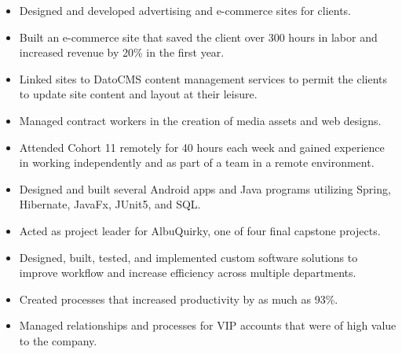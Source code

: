 \documentclass[12pt]{altacv}
\begin{document}

\begin{fullwidth}
\makecvheader
\end{fullwidth}


  \begin{itemize}
  \item Designed and developed advertising and e-commerce sites for clients.
  \item Built an e-commerce site that saved the client over 300 hours in labor and increased revenue by 20\% in the first year.
  \item Linked sites to DatoCMS content management services to permit the clients to update site content and layout at their leisure.
  \item Managed contract workers in the creation of media assets and web designs.
  \end{itemize}

  \divider

  \begin{itemize}
  \item Attended Cohort 11 remotely for 40 hours each week and gained experience in working independently and as part of a team in a remote environment.
  \item Designed and built several Android apps and Java programs utilizing Spring, Hibernate, JavaFx, JUnit5, and SQL.
  \item Acted as project leader for AlbuQuirky, one of four final capstone projects.
  \end{itemize}

  \divider

  \begin{itemize}
  \item Designed, built, tested, and implemented custom software solutions to improve workflow and increase efficiency across multiple departments.
  \item Created processes that increased productivity by as much as 93\%.
  \item Managed relationships and processes for VIP accounts that were of high value to the company.
  \end{itemize}

\medskip
\end{document}
